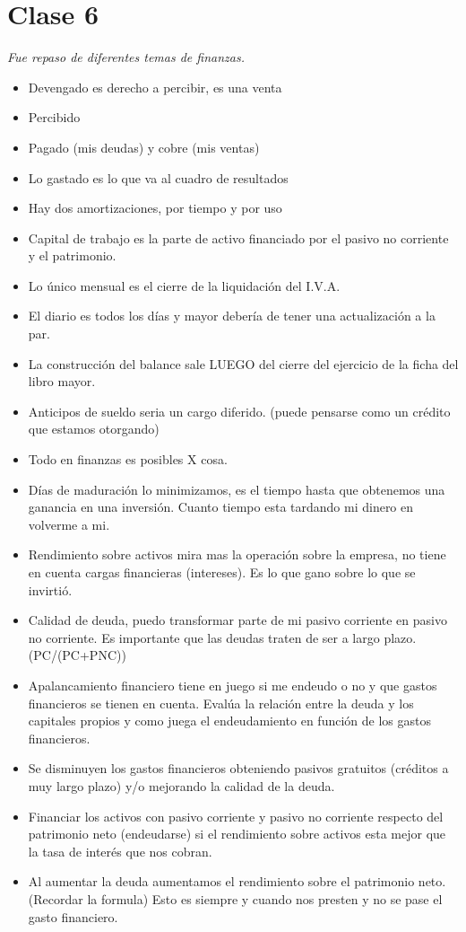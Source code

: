 \documentclass[titlepage,a4paper]{article}
\begin{document}
\newpage
\section*{Clase 6}
\textit{Fue repaso de diferentes temas de finanzas.}
\medskip

\begin{itemize}
\item Devengado es derecho a percibir, es una venta
\item Percibido
\item Pagado (mis deudas) y cobre (mis ventas)
\item Lo gastado es lo que va al cuadro de resultados
\item Hay dos amortizaciones, por tiempo y por uso
\item Capital de trabajo es la parte de activo financiado por el pasivo no corriente y el patrimonio.
\item Lo único mensual es el cierre de la liquidación del I.V.A.
\item El diario es todos los días y mayor debería de tener una actualización a la par.
\item La construcción del balance sale LUEGO del cierre del ejercicio de la ficha del libro mayor.
\item Anticipos de sueldo seria un cargo diferido. (puede pensarse como un crédito que estamos otorgando)
\item Todo en finanzas es posibles X cosa.
\item Días de maduración lo minimizamos, es el tiempo hasta que obtenemos una ganancia en una inversión. Cuanto tiempo esta tardando mi dinero en volverme a mi.
\item Rendimiento sobre activos mira mas la operación sobre la empresa, no tiene en cuenta cargas financieras (intereses). Es lo que gano sobre lo que se invirtió.
\item Calidad de deuda, puedo transformar parte de mi pasivo corriente en pasivo no corriente. Es importante que las deudas traten de ser a largo plazo. (PC/(PC+PNC))
\item Apalancamiento financiero tiene en juego si me endeudo o no y que gastos financieros se tienen en cuenta. Evalúa la relación entre la deuda y los capitales propios y como juega el endeudamiento en función de los gastos financieros. 
\item Se disminuyen los gastos financieros obteniendo pasivos gratuitos (créditos a muy largo plazo) y/o mejorando la calidad de la deuda.
\item Financiar los activos con pasivo corriente y pasivo no corriente respecto del patrimonio neto (endeudarse) si el rendimiento sobre activos esta mejor que la tasa de interés que nos cobran.
\item Al aumentar la deuda aumentamos el rendimiento sobre el patrimonio neto. (Recordar la formula) Esto es siempre y cuando nos presten y no se pase el gasto financiero.
\end{itemize}
\end{document}
